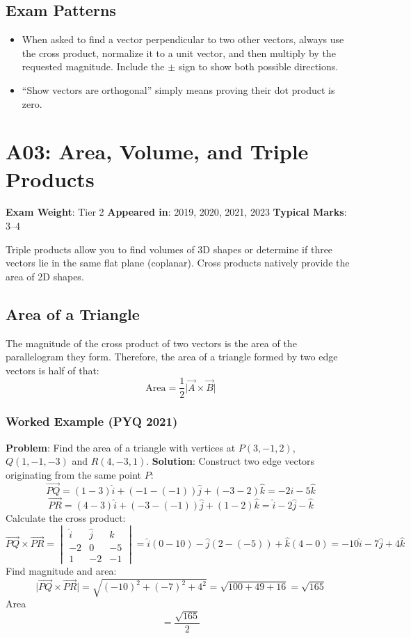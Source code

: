 \documentclass[
]{article}
\providecommand{\tightlist}{%
  \setlength{\itemsep}{0pt}\setlength{\parskip}{0pt}}
\renewenvironment{quote}
  {\begin{tcolorbox}[
     colback=calloutbg,
     colframe=calloutframe,
     colupper=callouttext,
     arc=3pt,
     boxrule=0.5pt,
     leftrule=0.5pt,
     borderline west={3pt}{0pt}{calloutaccent},
     left=8pt,
     right=8pt,
     top=6pt,
     bottom=6pt
   ]}
  {\end{tcolorbox}}
\begin{document}
\subsection{Exam Patterns}\label{exam-patterns-1}

\begin{itemize}
\tightlist
\item
  When asked to find a vector perpendicular to two other vectors, always
  use the cross product, normalize it to a unit vector, and then
  multiply by the requested magnitude. Include the \(\pm\) sign to show
  both possible directions.
\item
  ``Show vectors are orthogonal'' simply means proving their dot product
  is zero.
\end{itemize}

\section{A03: Area, Volume, and Triple
Products}\label{a03-area-volume-and-triple-products}

\begin{quote}
\textbf{Exam Weight}: Tier 2 \textbar{} \textbf{Appeared in}: 2019,
2020, 2021, 2023 \textbar{} \textbf{Typical Marks}: 3--4
\end{quote}

Triple products allow you to find volumes of 3D shapes or determine if
three vectors lie in the same flat plane (coplanar). Cross products
natively provide the area of 2D shapes.

\subsection{Area of a Triangle}\label{area-of-a-triangle}

The magnitude of the cross product of two vectors is the area of the
parallelogram they form. Therefore, the area of a triangle formed by two
edge vectors is half of that:
\[
\text{Area} = \frac{1}{2}\lvert \vec{A} \times \vec{B} \rvert
\]
\subsubsection{Worked Example (PYQ 2021)}\label{worked-example-pyq-2021}

\textbf{Problem}: Find the area of a triangle with vertices at
\(P(3, -1, 2)\), \(Q(1, -1, -3)\) and \(R(4, -3, 1)\).
\textbf{Solution}: Construct two edge vectors originating from the same
point \(P\):
\[
\vec{PQ} = (1 - 3)\hat{i} + (-1 - (-1))\hat{j} + (-3 - 2)\hat{k} = -2\hat{i} - 5\hat{k}
\]
\[
\vec{PR} = (4 - 3)\hat{i} + (-3 - (-1))\hat{j} + (1 - 2)\hat{k} = \hat{i} - 2\hat{j} - \hat{k}
\]
Calculate the cross product:
\[
\vec{PQ} \times \vec{PR} =
\begin{vmatrix}
\hat{i} & \hat{j} & \hat{k} \\
-2 & 0 & -5 \\
1 & -2 & -1
\end{vmatrix} = \hat{i}(0 - 10) - \hat{j}(2 - (-5)) + \hat{k}(4 - 0) = -10\hat{i} - 7\hat{j} + 4\hat{k}
\]
Find magnitude and area:
\[
\lvert \vec{PQ} \times \vec{PR} \rvert = \sqrt{(-10)^2 + (-7)^2 + 4^2} = \sqrt{100 + 49 + 16} = \sqrt{165}
\]
Area
\[
= \frac{\sqrt{165}}{2}
\]
\end{document}
